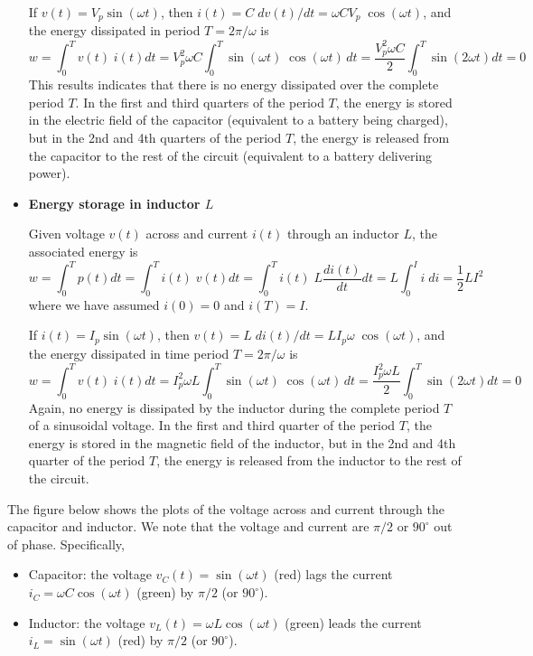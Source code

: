 \documentclass{article}
\begin{document}
\begin{itemize}
  If $v(t)=V_p \sin(\omega t)$, then
  $i(t)=C\;dv(t)/dt=\omega C V_p\;\cos(\omega t)$, and the energy dissipated
  in period $T=2\pi/\omega$ is
  \begin{equation} 
    w= \int_0^T v(t)\; i(t) dt
    =V_p^2\omega C\int_0^T \sin(\omega t)\;\cos(\omega t)\,dt
    =\frac{V_p^2\omega C}{2} \int_0^T \sin(2\omega t) dt=0 
  \end{equation}
  This results indicates that there is no energy dissipated over the complete 
  period $T$. In the first and third quarters of the period $T$, the energy
  is stored in the electric field of the capacitor (equivalent to a battery 
  being charged), but in the 2nd and 4th quarters of the period $T$, the energy
  is released from the capacitor to the rest of the circuit (equivalent to a 
  battery delivering power).
  
\item {\bf Energy storage in inductor $L$}

  Given voltage $v(t)$ across and current $i(t)$ through an inductor $L$,
  the associated energy is
  \begin{equation}	
    w=\int_0^T p(t)dt=\int_0^T i(t)\; v(t) dt
    =\int_0^T i(t) \;L \frac{di(t)}{dt} dt
    =L \int_0^I i\;di=\frac{1}{2}LI^2
  \end{equation}
  where we have assumed $i(0)=0$ and $i(T)=I$. 

  If $i(t)=I_p \sin(\omega t)$, then
  $v(t)= L\;di(t)/dt=L I_p\omega\;\cos(\omega t)$, and the energy dissipated
  in time period $T=2\pi/\omega$ is
  \begin{equation}
    w=\int_0^T v(t)\;i(t) dt=I_p^2\omega L\int_0^T \sin(\omega t)\;\cos(\omega t)\,dt
    =\frac{I_p^2\omega L}{2} \int_0^T \sin(2\omega t) dt=0 
  \end{equation}
  Again, no energy is dissipated by the inductor during the complete period
  $T$ of a sinusoidal voltage. In the first and third quarter of the period 
  $T$, the energy is stored in the magnetic field of the inductor, but in 
  the 2nd and 4th quarter of the period $T$, the energy is released from the 
  inductor to the rest of the circuit.

\end{itemize}

The figure below shows the plots of the voltage across and current through the 
capacitor and inductor. We note that the voltage and current are $\pi/2$ or
$90^\circ$ out of phase. Specifically,
\begin{itemize}
\item Capacitor: the voltage $v_C(t)=\sin(\omega t)$ (red) lags the current
  $i_C=\omega C\cos(\omega t)$ (green) by $\pi/2$ (or $90^\circ$).
\item Inductor: the voltage $v_L(t)=\omega L \cos(\omega t)$ (green) leads 
  the current $i_L=\sin(\omega t)$ (red) by $\pi/2$ (or $90^\circ$).
\end{itemize}
\end{document}
